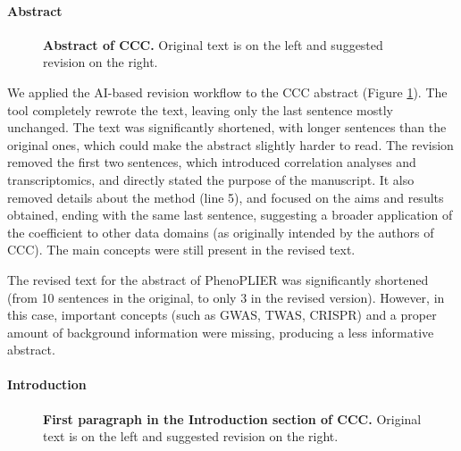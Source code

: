 \documentclass[
]{article}
\begin{document}
\hypertarget{abstract-1}{%
\paragraph{Abstract}\label{abstract-1}}

\begin{figure}
\hypertarget{fig:abstract:ccc}{%
\centering

\caption{\textbf{Abstract of CCC.}
Original text is on the left and suggested revision on the right.}\label{fig:abstract:ccc}
}
\end{figure}

We applied the AI-based revision workflow to the CCC abstract (Figure \ref{fig:abstract:ccc}).
The tool completely rewrote the text, leaving only the last sentence mostly unchanged.
The text was significantly shortened, with longer sentences than the original ones, which could make the abstract slightly harder to read.
The revision removed the first two sentences, which introduced correlation analyses and transcriptomics, and directly stated the purpose of the manuscript.
It also removed details about the method (line 5), and focused on the aims and results obtained, ending with the same last sentence, suggesting a broader application of the coefficient to other data domains (as originally intended by the authors of CCC).
The main concepts were still present in the revised text.

The revised text for the abstract of PhenoPLIER was significantly shortened (from 10 sentences in the original, to only 3 in the revised version).
However, in this case, important concepts (such as GWAS, TWAS, CRISPR) and a proper amount of background information were missing, producing a less informative abstract.

\hypertarget{introduction-1}{%
\paragraph{Introduction}\label{introduction-1}}

\begin{figure}
\hypertarget{fig:intro:ccc}{%
\centering

\caption{\textbf{First paragraph in the Introduction section of CCC.}
Original text is on the left and suggested revision on the right.}\label{fig:intro:ccc}
}
\end{figure}
\end{document}

